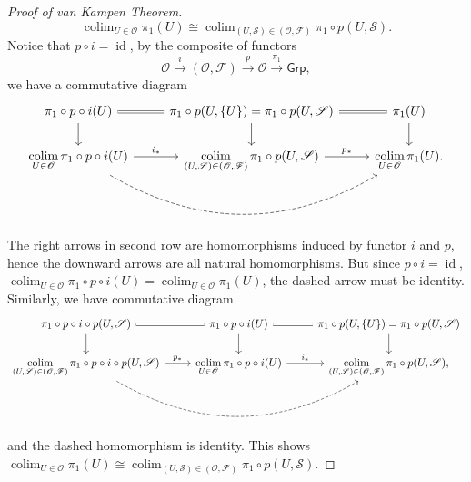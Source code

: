 \documentclass[a4paper]{amsart}
\theoremstyle{plain}
\theoremstyle{definition}
\theoremstyle{remark}
\DeclareMathOperator*{\colim}{colim}
\begin{document}
\begin{proof}[Proof of van Kampen Theorem]
    \[\colim_{U\in\mathscr{O}}\pi_1(U)\cong\colim_{(U,\mathscr{S})\in(\mathscr{O},\mathscr{F})}\pi_1\circ p(U,\mathscr{S}).\]
    Notice that $p\circ i=\operatorname{id}$, by the composite of functors
    \[\mathscr{O}\xrightarrow{i}(\mathscr{O},\mathscr{F})\xrightarrow{p}\mathscr{O}\xrightarrow{\pi_1}\mathsf{Grp},\]
    we have a commutative diagram
    \[\begin{tikzcd}
        \pi_1\circ p\circ i(U) \ar[r, equal] \ar[d] & \pi_1\circ p(U,\{U\})=\pi_1\circ p(U,\mathscr{S}) \ar[r, equal] \ar[d] & \pi_1(U) \ar[d] \\
        \colim\limits_{U\in\mathscr{O}}\pi_1\circ p\circ i(U)\ar[r, "{i_*}"] \ar[rr, dashed, bend right] & \colim\limits_{(U,\mathscr{S})\in(\mathscr{O},\mathscr{F})}\pi_1\circ p(U,\mathscr{S}) \ar[r, "{p_*}"] & \colim\limits_{U\in\mathscr{O}}\pi_1(U).
    \end{tikzcd}\]
    The right arrows in second row are homomorphisms induced by functor $i$ and $p$, hence the downward arrows are all natural homomorphisms.
    But since $p\circ i=\operatorname{id}$, $\colim_{U\in\mathscr{O}}\pi_1\circ p\circ i(U)=\colim_{U\in\mathscr{O}}\pi_1(U)$, the dashed arrow must be identity.
    Similarly, we have commutative diagram
    \[\begin{tikzcd}
        \pi_1\circ p\circ i\circ p(U,\mathscr{S}) \ar[r, equal] \ar[d] & \pi_1\circ p\circ i(U) \ar[r, equal] \ar[d] & \pi_1\circ p(U,\{U\})=\pi_1\circ p(U,\mathscr{S}) \ar[d]\\
        \colim\limits_{(U,\mathscr{S})\in(\mathscr{O},\mathscr{F})}\pi_1\circ p\circ i\circ p(U,\mathscr{S}) \ar[r, "p_*"] \ar[rr, bend right, dashed] & \colim\limits_{U\in\mathscr{O}}\pi_1\circ p\circ i(U) \ar[r, "i_*"] & \colim\limits_{(U,\mathscr{S})\in(\mathscr{O},\mathscr{F})}\pi_1\circ p(U,\mathscr{S}),
    \end{tikzcd}\]
    and the dashed homomorphism is identity.
    This shows $\colim_{U\in\mathscr{O}}\pi_1(U)\cong\colim_{(U,\mathscr{S})\in(\mathscr{O},\mathscr{F})}\pi_1\circ p(U,\mathscr{S})$.
\end{proof}
\end{document}
